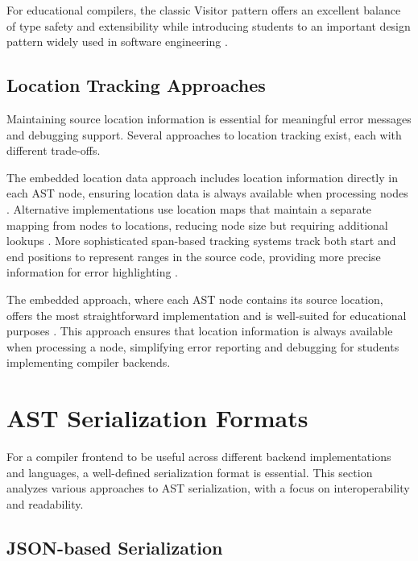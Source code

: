 For educational compilers, the classic Visitor pattern offers an excellent balance of type safety and extensibility while introducing students to an important design pattern widely used in software engineering \cite{gamma1995design}.

\subsection{Location Tracking Approaches}

Maintaining source location information is essential for meaningful error messages and debugging support. Several approaches to location tracking exist, each with different trade-offs.

The embedded location data approach includes location information directly in each AST node, ensuring location data is always available when processing nodes \cite{appel2004modern}. Alternative implementations use location maps that maintain a separate mapping from nodes to locations, reducing node size but requiring additional lookups \cite{lesk1975lex}. More sophisticated span-based tracking systems track both start and end positions to represent ranges in the source code, providing more precise information for error highlighting \cite{parr2013definitive}.

The embedded approach, where each AST node contains its source location, offers the most straightforward implementation and is well-suited for educational purposes \cite{appel2004modern}. This approach ensures that location information is always available when processing a node, simplifying error reporting and debugging for students implementing compiler backends.








\section{AST Serialization Formats}

For a compiler frontend to be useful across different backend implementations and languages, a well-defined serialization format is essential. This section analyzes various approaches to AST serialization, with a focus on interoperability and readability.

\subsection{JSON-based Serialization}

